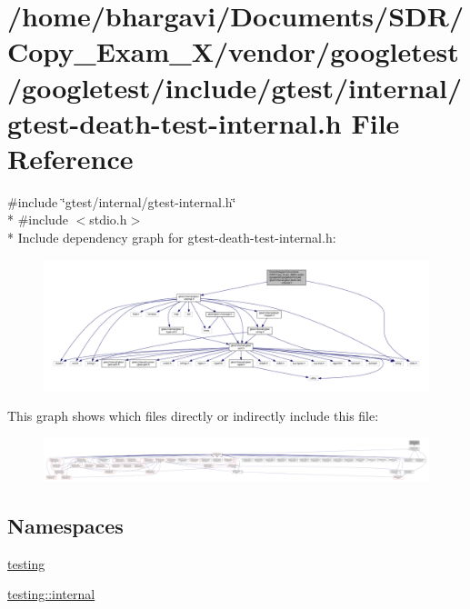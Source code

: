 \hypertarget{gtest-death-test-internal_8h}{}\section{/home/bhargavi/\+Documents/\+S\+D\+R/\+Copy\+\_\+\+Exam\+\_\+X/vendor/googletest/googletest/include/gtest/internal/gtest-\/death-\/test-\/internal.h File Reference}
\label{gtest-death-test-internal_8h}
{\ttfamily \#include \char`\"{}gtest/internal/gtest-\/internal.\+h\char`\"{}}\\*
{\ttfamily \#include $<$stdio.\+h$>$}\\*
Include dependency graph for gtest-\/death-\/test-\/internal.h\+:
\nopagebreak
\begin{figure}[H]
\begin{center}
\leavevmode
\includegraphics[width=350pt]{gtest-death-test-internal_8h__incl}
\end{center}
\end{figure}
This graph shows which files directly or indirectly include this file\+:
\nopagebreak
\begin{figure}[H]
\begin{center}
\leavevmode
\includegraphics[width=350pt]{gtest-death-test-internal_8h__dep__incl}
\end{center}
\end{figure}
\subsection*{Namespaces}
\begin{DoxyCompactItemize}
\item 
 \hyperlink{namespacetesting}{testing}
\item 
 \hyperlink{namespacetesting_1_1internal}{testing\+::internal}
\end{DoxyCompactItemize}
